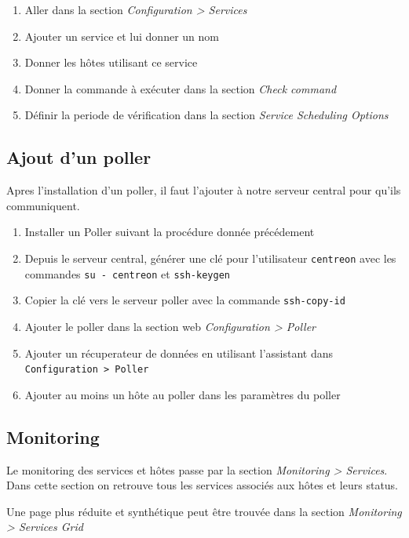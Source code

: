 		\begin{enumerate}
			\item Aller dans la section \emph{Configuration > Services}
			\item Ajouter un service et lui donner un nom
			\item Donner les hôtes utilisant ce service
			\item Donner la commande à exécuter dans la section \emph{Check command}
			\item Définir la periode de vérification dans la section \emph{Service Scheduling Options}
		\end{enumerate}

		\subsection{Ajout d'un poller}

		Apres l'installation d'un poller, il faut l'ajouter à notre serveur central pour qu'ils communiquent.

		\begin{enumerate}
			\item Installer un Poller suivant la procédure donnée précédement
			\item Depuis le serveur central, générer une clé pour l'utilisateur \texttt{centreon} avec les commandes \texttt{su - centreon} et \texttt{ssh-keygen}
			\item Copier la clé vers le serveur poller avec la commande \texttt{ssh-copy-id}
			\item Ajouter le poller dans la section web \emph{Configuration > Poller}
			\item Ajouter un récuperateur de données en utilisant l'assistant dans \texttt{Configuration > Poller}
			\item Ajouter au moins un hôte au poller dans les paramètres du poller
		\end{enumerate}


		\subsection{Monitoring}

		Le monitoring des services et hôtes passe par la section \emph{Monitoring > Services}.
		Dans cette section on retrouve tous les services associés aux hôtes et leurs status.

		Une page plus réduite et synthétique peut être trouvée dans la section \emph{Monitoring > Services Grid}


